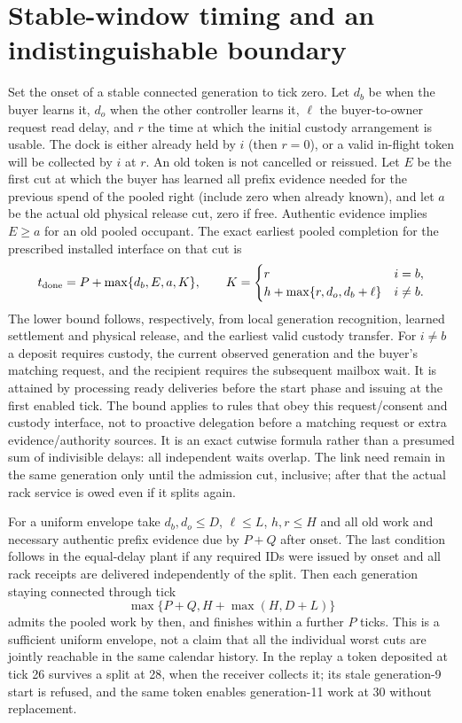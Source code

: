 \documentclass[11pt]{article}
\begin{document}
\section{Stable-window timing and an indistinguishable boundary}
Set the onset of a stable connected generation to tick zero. Let $d_b$ be when the buyer learns it, $d_o$ when the other controller learns it, $\ell$ the buyer-to-owner request read delay, and $r$ the time at which the initial custody arrangement is usable. The dock is either already held by $i$ (then $r=0$), or a valid in-flight token will be collected by $i$ at $r$. An old token is not cancelled or reissued. Let $E$ be the first cut at which the buyer has learned all prefix evidence needed for the previous spend of the pooled right (include zero when already known), and let $a$ be the actual old physical release cut, zero if free. Authentic evidence implies $E\ge a$ for an old pooled occupant. The exact earliest pooled completion for the prescribed installed interface on that cut is
\[
 t_{\rm done}=P+\max\{d_b,E,a, K\},\qquad
 K=\begin{cases}
 r & i=b,\\
 h+\max\{r,d_o,d_b+\ell\}&i\ne b .
 \end{cases}
\]
The lower bound follows, respectively, from local generation recognition, learned settlement and physical release, and the earliest valid custody transfer. For $i\ne b$ a deposit requires custody, the current observed generation and the buyer's matching request, and the recipient requires the subsequent mailbox wait. It is attained by processing ready deliveries before the start phase and issuing at the first enabled tick. The bound applies to rules that obey this request/consent and custody interface, not to proactive delegation before a matching request or extra evidence/authority sources. It is an exact cutwise formula rather than a presumed sum of indivisible delays: all independent waits overlap. The link need remain in the same generation only until the admission cut, inclusive; after that the actual rack service is owed even if it splits again.

For a uniform envelope take $d_b,d_o\le D$, $\ell\le L$, $h,r\le H$ and all old work and necessary authentic prefix evidence due by $P+Q$ after onset. The last condition follows in the equal-delay plant if any required IDs were issued by onset and all rack receipts are delivered independently of the split. Then each generation staying connected through tick
\[
             \max\{P+Q,H+\max(H,D+L)\}
\]
admits the pooled work by then, and finishes within a further $P$ ticks. This is a sufficient uniform envelope, not a claim that all the individual worst cuts are jointly reachable in the same calendar history. In the replay a token deposited at tick 26 survives a split at 28, when the receiver collects it; its stale generation-9 start is refused, and the same token enables generation-11 work at 30 without replacement.
\end{document}
